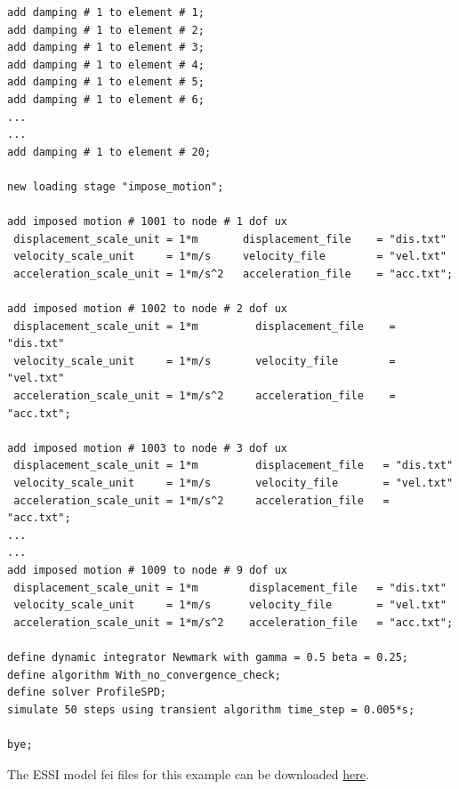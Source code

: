 \begin{lstlisting}
add damping # 1 to element # 1;
add damping # 1 to element # 2;
add damping # 1 to element # 3;
add damping # 1 to element # 4;
add damping # 1 to element # 5;
add damping # 1 to element # 6;
...
...
add damping # 1 to element # 20;

new loading stage "impose_motion";

add imposed motion # 1001 to node # 1 dof ux 
 displacement_scale_unit = 1*m       displacement_file    = "dis.txt" 
 velocity_scale_unit     = 1*m/s     velocity_file        = "vel.txt" 
 acceleration_scale_unit = 1*m/s^2   acceleration_file    = "acc.txt";

add imposed motion # 1002 to node # 2 dof ux 
 displacement_scale_unit = 1*m         displacement_file    = "dis.txt" 
 velocity_scale_unit     = 1*m/s       velocity_file        = "vel.txt" 
 acceleration_scale_unit = 1*m/s^2     acceleration_file    = "acc.txt";

add imposed motion # 1003 to node # 3 dof ux 
 displacement_scale_unit = 1*m         displacement_file   = "dis.txt" 
 velocity_scale_unit     = 1*m/s       velocity_file       = "vel.txt" 
 acceleration_scale_unit = 1*m/s^2     acceleration_file   = "acc.txt";
...
...
add imposed motion # 1009 to node # 9 dof ux 
 displacement_scale_unit = 1*m        displacement_file   = "dis.txt" 
 velocity_scale_unit     = 1*m/s      velocity_file       = "vel.txt" 
 acceleration_scale_unit = 1*m/s^2    acceleration_file   = "acc.txt";

define dynamic integrator Newmark with gamma = 0.5 beta = 0.25;
define algorithm With_no_convergence_check;
define solver ProfileSPD;
simulate 50 steps using transient algorithm time_step = 0.005*s;
         
bye;
\end{lstlisting}


The ESSI model fei files for this example can be downloaded 
\href{https://github.com/BorisJeremic/Real-ESSI-Examples/blob/master/model_fei_file/27NodeBrick_dynamic_impose_motion/27NodeBrick_dynamic_impose_motion.tgz?raw=true}{here}.
























